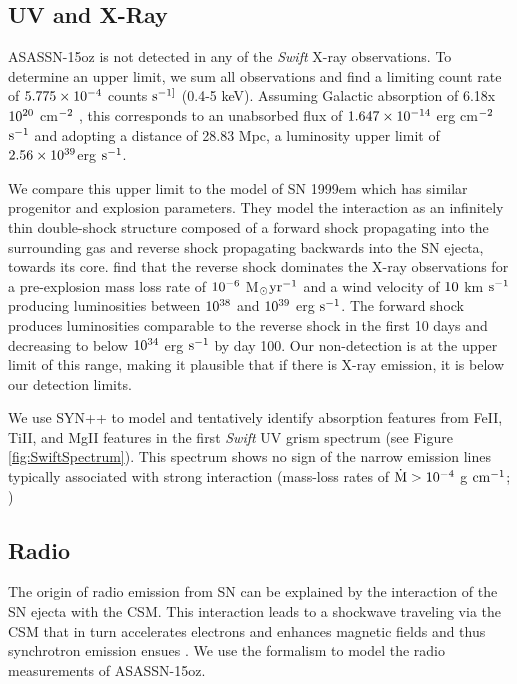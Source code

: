 \documentclass[a4paper,fleqn,usenatbib]{mnras}
\newcommand{\msunperiod}{M$\rm{_{\odot}}$}
\begin{document}
\subsection{UV and X-Ray}
ASASSN-15oz is not detected in any of the \textit{Swift} X-ray observations. 
To determine an upper limit, we sum all observations and find a limiting count rate of  $\rm{5.775\times10^{-4}}$ counts $\rm{s^{-1]}}$ (0.4-5 keV).
Assuming Galactic absorption of 6.18x$\rm{10^{20}}$ cm$\rm{^{-2}}$ \citep{2005kalberla}, this corresponds to an unabsorbed flux of $\rm{1.647\times10^{-14}}$ erg cm$\rm{^{-2}}$ $\rm{s^{-1}}$ and adopting a distance of 28.83 Mpc, a luminosity upper limit of $\rm{2.56 \times10^{39}}$erg $\rm{s^{-1}}$.

We compare this upper limit to the model of SN 1999em \citep{2007chugai} which has similar progenitor and explosion parameters. 
They model the interaction as an infinitely thin double-shock structure \citep{1982chevalier, 1985nadyozhin} composed of a forward shock propagating into the surrounding gas and reverse shock propagating backwards into the SN ejecta, towards its core. 
\citet{2007chugai} find that the reverse shock dominates the X-ray observations for a pre-explosion mass loss rate of $\rm{10^{-6}}$ \msunperiod $\rm{yr^{-1}}$ and a wind velocity of $\rm{10}$ km $\rm{s^{-1}}$ producing luminosities between $\rm{10^{38}}$ and $\rm{10^{39}}$ erg $\rm{s^{-1}}$. 
The forward shock produces luminosities comparable to the reverse shock in the first 10 days and decreasing to below $\rm{10^{34}}$ erg $\rm{s^{-1}}$ by day 100.  
Our non-detection is at the upper limit of this range, making it plausible that if there is X-ray emission, it is below our detection limits.

We use SYN++ to model and tentatively identify absorption features from FeII, TiII, and MgII features in the first {\it Swift} UV grism spectrum (see Figure \ref{fig:SwiftSpectrum}). 
This spectrum shows no sign of the narrow emission lines typically associated with strong interaction (mass-loss rates of $\rm{\dot{M}>10^{-4}}$ g $\rm{cm^{-1}}$; \citealt{2012kiewe})
\subsection{Radio}
The origin of radio emission from SN can be explained by the interaction of the SN ejecta with the CSM. 
This interaction leads to a shockwave traveling via the CSM that in turn accelerates electrons and enhances magnetic fields and thus synchrotron emission ensues \citep{1982chevalier,1998chevalier, 2002weiler, 2006chevalier}. 
We use the \citet{1998chevalier} formalism to model the radio measurements of ASASSN-15oz. 
\end{document}
